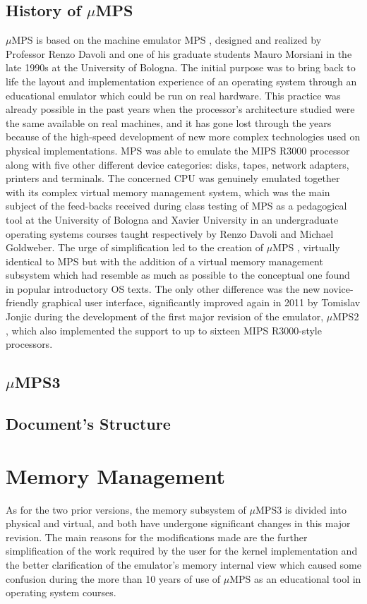 \documentclass[12pt,a4paper,openright,twoside]{report}
\begin{document}
\section{History of $\mu$MPS}
	$\mu$MPS is based on the machine emulator MPS \cite{mps}, designed and realized by Professor Renzo Davoli and one of his graduate students Mauro Morsiani in the late 1990s at the University of Bologna.
	The initial purpose was to bring back to life the layout and implementation experience of an operating system through an educational emulator which could be run on real hardware.
	This practice was already possible in the past years when the processor's architecture studied were the same available on real machines, and it has gone lost through the years because of the high-speed development of new more complex technologies used on physical implementations.
	MPS was able to emulate the MIPS R3000 processor along with five other different device categories: disks, tapes, network adapters, printers and terminals.
	The concerned CPU was genuinely emulated together with its complex virtual memory management system, which was the main subject of the feed-backs received during class testing of MPS as a pedagogical tool at the University of Bologna and Xavier University in an undergraduate operating systems courses taught respectively by Renzo Davoli and Michael Goldweber.
	The urge of simplification led to the creation of $\mu$MPS \cite{umps}, virtually identical to MPS but with the addition of a virtual memory management subsystem which had resemble as much as possible to the conceptual one found in popular introductory OS texts.
	The only other difference was the new novice-friendly graphical user interface, significantly improved again in 2011 by Tomislav Jonjic during the development of the first major revision of the emulator, $\mu$MPS2 \cite{umps2}, which also implemented the support to up to sixteen MIPS R3000-style processors.

\section{$\mu$MPS3}

\section{Document's Structure}
\chapter{Memory Management}
\lhead[\fancyplain{}{\bfseries\thepage}]{\fancyplain{}{\bfseries\rightmark}}
	As for the two prior versions, the memory subsystem of $\mu$MPS3 is divided into physical and virtual, and both have undergone significant changes in this major revision.
	The main reasons for the modifications made are the further simplification of the work required by the user for the kernel implementation and the better clarification of the emulator's memory internal view which caused some confusion during the more than 10 years of use of $\mu$MPS as an educational tool in operating system courses.
\end{document}
